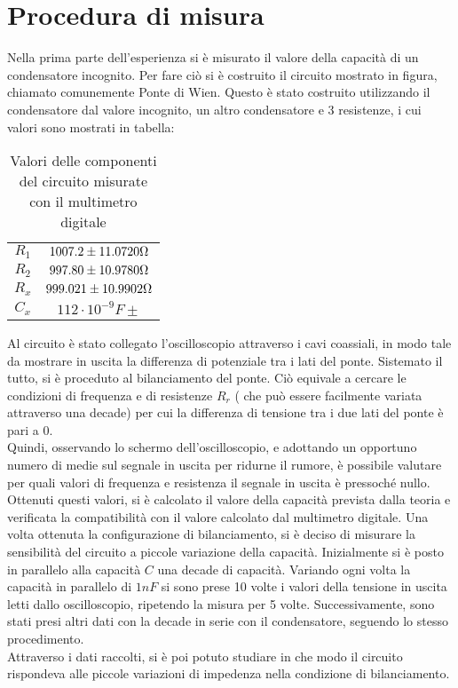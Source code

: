 \documentclass[12pt,]{article}
\begin{document}
\section{Procedura di misura}
Nella prima parte dell'esperienza si è misurato il valore della capacità di un condensatore incognito. Per fare ciò si è costruito il circuito mostrato in figura, chiamato comunemente Ponte di Wien. Questo è stato costruito utilizzando il condensatore dal valore incognito, un altro condensatore e 3 resistenze, i cui valori sono mostrati in tabella: 

\begin{table}[H]
\centering
\begin{tabular}{c|c}
\toprule 
\midrule
$R_1$ &  $1007.2\pm 11.0720 \ohm$   \\
$R_2$ &  $997.80\pm 10.9780 \ohm$  \\
$R_x$ & $999.021 \pm 10.9902 \ohm$  \\
$C_x$ & $112 \cdot 10^{-9} F \pm $ \\
\bottomrule
\end{tabular}
\caption{Valori delle componenti del circuito misurate con il multimetro digitale}
\end{table}
Al circuito è stato collegato l'oscilloscopio attraverso i cavi coassiali, in modo tale da mostrare in uscita la differenza di potenziale tra i lati del ponte. Sistemato il tutto, si è proceduto al bilanciamento del ponte. Ciò equivale a cercare le condizioni di frequenza e di resistenze $R_r$ ( che può essere facilmente variata attraverso una decade) per cui la differenza di tensione tra i due lati del ponte è pari a 0. \\
Quindi, osservando lo schermo dell'oscilloscopio, e adottando un opportuno numero di medie sul segnale in uscita per ridurne il rumore, è possibile valutare per quali valori di frequenza e resistenza il segnale in uscita è pressoché nullo. Ottenuti questi valori, si è calcolato il valore della capacità prevista dalla teoria e verificata la compatibilità con il valore calcolato dal multimetro digitale. \newline \break
Una volta ottenuta la configurazione di bilanciamento, si è deciso di misurare la sensibilità del circuito a piccole variazione della capacità. Inizialmente si è posto in parallelo alla capacità $C$ una decade di capacità. Variando ogni volta la capacità in parallelo di $1 nF$ si sono prese 10 volte i valori della tensione in uscita letti dallo oscilloscopio, ripetendo la misura per 5 volte. Successivamente, sono stati presi altri dati con la decade in serie con il condensatore, seguendo lo stesso procedimento.\\
Attraverso i dati raccolti, si è poi potuto studiare in che modo il circuito rispondeva alle piccole variazioni di impedenza nella condizione di bilanciamento. 
\end{document}
